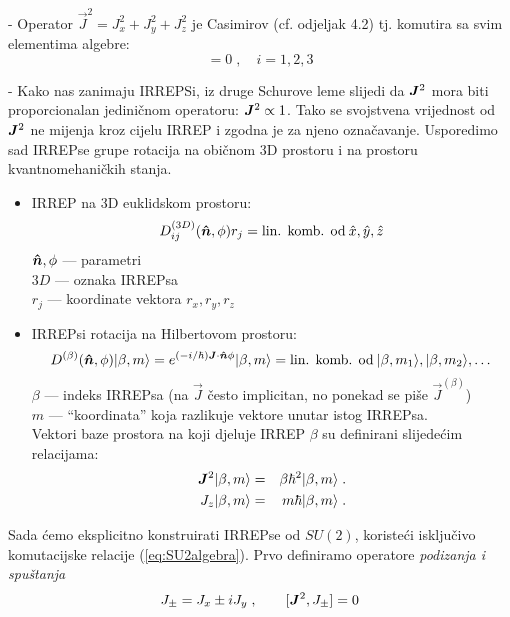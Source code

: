- Operator $\vec{J}^2 = J_{x}^2 + J_{y}^2 + J_{z}^2$ je Casimirov
  (cf. odjeljak 4.2) tj. komutira sa svim elementima algebre:
\begin{equation}
   [\jsq, J_{i}^2]=0\;, \quad i=1,2,3
\end{equation}

- Kako nas zanimaju IRREPSi, iz druge Schurove leme slijedi da $\jsq$
mora biti proporcionalan jediničnom operatoru: $\jsq \propto \Eins$.
Tako se svojstvena vrijednost od $\jsq$ ne mijenja kroz cijelu IRREP i
zgodna je za njeno označavanje. Usporedimo sad IRREPse grupe rotacija
na običnom 3D prostoru i na prostoru kvantnomehaničkih stanja.

\begin{itemize}
\item  IRREP na 3D euklidskom prostoru:
\begin{displaymath}
   D^{(3D)}_{ij}(\unitn, \phi) r_j = \text{lin. komb. od}\: \hat{x}, \hat{y}, \hat{z}
\end{displaymath}
   $\unitn, \phi$ --- parametri \\
  $3D$ --- oznaka IRREPsa \\
  $r_j$ --- koordinate vektora $r_x, r_y, r_z$

\item IRREPsi rotacija na Hilbertovom prostoru:
\begin{displaymath}
   D^{(\beta)}(\unitn,\phi) \ket{\beta, m} =
 e^{(-i/\hbar)\vec{J}\cdot\unitn\phi}\ket{\beta, m} =
\text{lin. komb. od}\: \ket{\beta, m_1}, \ket{\beta, m_2}, \dots
\end{displaymath}
$\beta$ --- indeks IRREPsa (na $\vec{J}$ često implicitan, no
 ponekad se piše $\vec{J}^{(\beta)}$) \\
$ m $ --- ``koordinata'' koja razlikuje vektore unutar istog IRREPsa.\\
 Vektori baze prostora na koji djeluje IRREP $\beta$ su definirani slijedećim
relacijama:
\begin{eqnarray}
  \jsq \ket{\beta, m} &=& \beta \hbar^2 \ket{\beta, m} \;.  \\
  J_z \ket{\beta, m} &=& m \hbar \ket{\beta, m} \;.
\end{eqnarray}
\end{itemize}

Sada ćemo eksplicitno konstruirati IRREPse od $SU(2)$, koristeći
isključivo komutacijske relacije (\ref{eq:SU2algebra}).
Prvo definiramo operatore \emph{podizanja i spuštanja}
\begin{displaymath}
    J_{\pm} = J_x \pm i J_y \;, \qquad [\jsq, J_\pm] =0
\end{displaymath}
 
